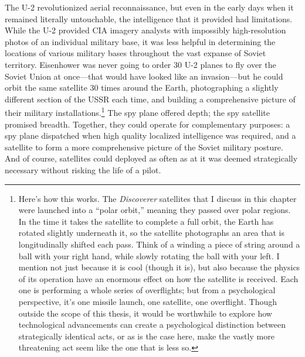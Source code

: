 \documentclass{report}
\begin{document}
The U-2 revolutionized aerial reconnaissance, but even in the early days when it remained literally untouchable, the intelligence that it provided had limitations. While the U-2 provided CIA imagery analysts with impossibly high-resolution photos of an individual military base, it was less helpful in determining the locations of various military bases throughout the vast expanse of Soviet territory. Eisenhower was never going to order 30 U-2 planes to fly over the Soviet Union at once---that would have looked like an invasion---but he could orbit the same satellite 30 times around the Earth, photographing a slightly different section of the USSR each time, and building a comprehensive picture of their military installations.\footnote{Here's how this works. The \emph{Discoverer} satellites that I discuss in this chapter were launched into a ``polar orbit,'' meaning they passed over polar regions. In the time it takes the satellite to complete a full orbit, the Earth has rotated slightly underneath it, so the satellite photographs an area that is longitudinally shifted each pass. Think of a winding a piece of string around a ball with your right hand, while slowly rotating the ball with your left. I mention not just because it is cool (though it is), but also because the physics of its operation have an enormous effect on how the satellite is received. Each one is performing a whole series of overflights; but from a psychological perspective, it's one missile launch, one satellite, one overflight. Though outside the scope of this thesis, it would be worthwhile to explore how technological advancements can create a psychological distinction between strategically identical acts, or as is the case here, make the vastly more threatening act seem like the one that is less so.} The spy plane offered depth; the spy satellite promised breadth. Together, they could operate for complementary purposes: a spy plane dispatched when high quality localized intelligence was required, and a satellite to form a more comprehensive picture of the Soviet military posture. And of course, satellites could deployed as often as at it was deemed strategically necessary without risking the life of a pilot.
\end{document}
